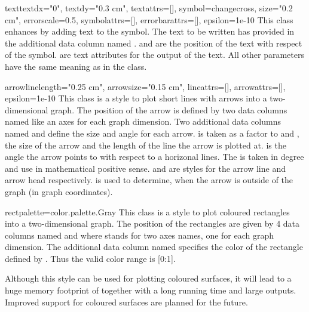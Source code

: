 \begin{classdesc}{text}{textdx="0", textdy="0.3 cm", textattrs=[],
                        symbol=changecross, size="0.2 cm",
                        errorscale=0.5, symbolattrs=[],
                        errorbarattrs=[], epsilon=1e-10}
  This class enhances  by adding text to the symbol. The
  text to be written has provided in the additional data column named
  .  and  are the position of the
  text with respect of the symbol.  are text
  attributes for the output of the text. All other parameters have the
  same meaning as in the  class.
\end{classdesc}

\begin{classdesc}{arrow}{linelength="0.25 cm", arrowsize="0.15 cm",
                         lineattrs=[], arrowattrs=[], epsilon=1e-10}
  This class is a style to plot short lines with arrows into a
  two-dimensional graph. The position of the arrow is defined by two
  data columns named like an axes for each graph dimension. Two
  additional data columns named  and  define
  the size and angle for each arrow.  is taken as a factor
  to  and , the size of the arrow and
  the length of the line the arrow is plotted at.  is the
  angle the arrow points to with respect to a horizonal lines. The
   is taken in degree and use in mathematical positive
  sense.  and  are styles for the arrow
  line and arrow head respectively.  is used to
  determine, when the arrow is outside of the graph (in graph
  coordinates).
\end{classdesc}

\begin{classdesc}{rect}{palette=color.palette.Gray}
  This class is a style to plot coloured rectangles into a
  two-dimensional graph. The position of the rectangles are given by 4
  data columns named  and  where  stands
  for two axes names, one for each graph dimension. The additional
  data column named  specifies the color of the rectangle
  defined by . Thus the valid color range is [0:1].

  \begin{note}
    Although this style can be used for plotting coloured surfaces, it
    will lead to a huge memory footprint of \PyX together with a
    long running time and large outputs. Improved support for coloured
    surfaces are planned for the future.
  \end{note}
\end{classdesc}

